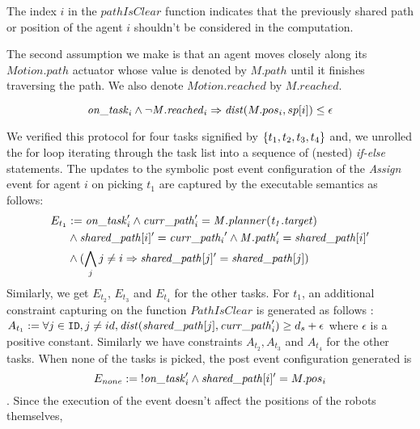  The index $i$ in the $\mathit{pathIsClear}$ function indicates that the previously shared path or position of the agent $i$ shouldn't be considered in the computation.

The second assumption we make is that an agent moves closely along its $\mathit{Motion.path}$ actuator whose value is denoted by $\mathit{M.path}$ until it finishes traversing the path. We also denote $\mathit{Motion.reached}$ by $\mathit{M.reached}$.
\begin{assumption}
        \label{stlinemotion}
    $$\mathit{on\_task}_i\wedge \neg \mathit{M.reached}_i \Rightarrow \mathit{dist}(M.pos_i, sp[i]) \leq \epsilon $$
\end{assumption}

We verified this protocol for four tasks signified by $\left\{t_1,t_2,t_3,t_4\right\}$ and, we unrolled the for loop iterating through the task list into a sequence of (nested) \emph{if-else} statements. The updates to the symbolic post event configuration of the \emph{Assign} event for agent $i$ on picking $t_1$ are captured by the \K executable semantics as follows: \begin{align*}E_{t_1} &:= \mathit{on\_task}_i' \wedge \mathit{curr\_path}_i' = \mathit{M.planner(t_1.target)} \\ &\wedge \mathit{shared\_path}[i]' = \mathit{curr\_path_i}' \wedge \mathit{M.path}_i' = \mathit{shared\_path}[i]' \\
  &\wedge (\bigwedge_j j\neq i \Rightarrow \mathit{shared\_path}[j]'= \mathit{shared\_path}[j] )
 \end{align*}
Similarly, we get $E_{t_2}$, $E_{t_3}$ and $E_{t_4}$ for the other tasks. For $t_1$, an additional constraint capturing  on the function $\mathit{PathIsClear}$ is generated as follows :  $A_{t_1} := \forall j \in \texttt{ID}, j \neq id, \mathit{dist}(\mathit{shared\_path}[j], \mathit{curr\_path}_i') \geq d_s + \epsilon$ where $\epsilon$ is a positive constant. Similarly we have constraints $A_{t_2}, A_{t_3}$  and $A_{t_4}$ for the other tasks. When none of the tasks is picked, the post event configuration generated is $$ E_{none} :=\mbox{!}\mathit{on\_task}_i' \wedge \mathit{shared\_path}[i]' = M.pos_i $$. Since the execution of the event doesn't affect the positions of the robots themselves, 

